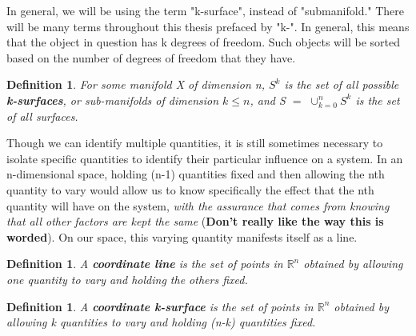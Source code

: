 \documentclass{book}
\newtheorem{defn}[equation]{Definition}
\begin{document}

In general, we will be using the term "k-surface", instead of "submanifold." There will be many terms throughout this thesis prefaced by "k-". In general, this means that the object in question has k degrees of freedom. Such objects will be sorted based on the number of degrees of freedom that they have.  


\begin{defn}
	For some manifold X of dimension n, $S^k$ is the set of all possible \textbf{k-surfaces}, or sub-manifolds of dimension $k \leq n$, and S $=$ $\cup^n_{k=0}S^k$ is the set of all surfaces. 
\end{defn}


Though we can identify multiple quantities, it is still sometimes necessary to isolate specific quantities to identify their particular influence on a system. In an n-dimensional space, holding (n-1) quantities fixed and then allowing the nth quantity to vary would allow us to know specifically the effect that the nth quantity will have on the system, \emph{with the assurance that comes from knowing that all other factors are kept the same} (\textbf{Don't really like the way this is worded}). On our space, this varying quantity manifests itself as a line. 

\begin{defn}
	A \textbf{coordinate line} is the set of points in $\mathbb{R}^n$ obtained by allowing one quantity to vary and holding the others fixed. 
\end{defn}

\begin{defn}
	A \textbf{coordinate k-surface} is the set of points in $\mathbb{R}^n$ obtained by allowing k quantities to vary and holding (n-k) quantities fixed.  
\end{defn}
\end{document}
